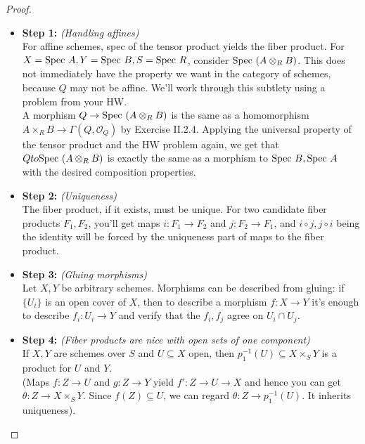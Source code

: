 \documentclass[10pt,reqno]{amsart}
\theoremstyle{definition}
\theoremstyle{remark}
\numberwithin{equation}{section}
\numberwithin{theorem}{section}
\newcommand{\OO}{{\mathcal O}}
\newcommand{\spec}{\textup{Spec }}
\begin{document}
\begin{proof}\text{ }
\begin{itemize}
\item \textbf{Step 1:} \textit{(Handling affines)} 
\\
For affine schemes, spec of the tensor product yields the fiber product. For $X = \spec A, Y = \spec B, S = \spec R$, consider $\spec (A \otimes_R B)$. This does not immediately have the property we want in the category of schemes, because $Q$ may not be affine. We'll work through this subtlety using a problem from your HW.
\\

A morphism $Q \to \spec(A \otimes_R B)$ is the same as a homomorphism $A \times_R B \to \Gamma(Q,\OO_Q)$ by Exercise II.2.4. Applying the universal property of the tensor product and the HW problem again, we get that $Q to \spec (A \otimes_R B)$ is exactly the  same as a morphism to $\spec B, \spec A$ with the desired composition properties.
\\

\item \textbf{Step 2:} \textit{(Uniqueness)} 
\\
The fiber product, if it exists, must be unique. For two candidate fiber products $F_1,F_2$, you'll get maps $i: F_1 \to F_2$ and $j: F_2 \to F_1$, and $i \circ j, j \circ i$ being the identity will be forced by the uniqueness part of maps to the fiber product.
\\

\item \textbf{Step 3:} \textit{(Gluing morphisms)} 
\\
Let $X,Y$ be arbitrary schemes. Morphisms can be described from gluing: if $\{U_i\}$ is an open cover of $X$, then to describe a morphism $f: X \to Y$ it's enough to describe $f_i :U_i \to Y$ and verify that the $f_i,f_j$ agree on $U_i \cap U_j$.
\\

\item \textbf{Step 4:} \textit{(Fiber products are nice with open sets of one component)} 
\\
If $X,Y$ are schemes over $S$ and $U \subseteq X$ open, then $p_1^{-1}(U) \subseteq X \times_S Y$ is a product for $U$ and $Y$.
\\

(Maps $f: Z \to U$ and $g: Z \to Y$ yield $f':Z \to U \to X$ and hence you can get $\theta: Z \to X \times_S Y$. Since $f(Z) \subseteq U$, we can regard $\theta: Z \to p_1^{-1}(U)$. It inherits uniqueness).
\\


\end{itemize}
\end{proof}
\end{document}
